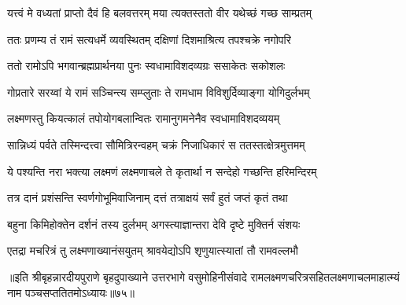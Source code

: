 \twolineshloka
{यत्त्वं मे वध्यतां प्राप्तो दैवं हि बलवत्तरम्}
{मया त्यक्तस्ततो वीर यथेच्छं गच्छ साम्प्रतम्}%

\twolineshloka
{ततः प्रणम्य तं रामं सत्यधर्मे व्यवस्थितम्}
{दक्षिणां दिशमाश्रित्य तपश्चक्रे नगोपरि}%

\twolineshloka
{ततो रामोऽपि भगवान्ब्रह्मप्रार्थनया पुनः}
{स्वधामाविशदव्यग्रः ससाकेतः सकोशलः}%

\twolineshloka
{गोप्रतारे सरय्वां ये रामं सञ्चिन्त्य सम्प्लुताः}
{ते रामधाम विविशुर्दिव्याङ्गा योगिदुर्लभम्}%

\twolineshloka
{लक्ष्मणस्तु कियत्कालं तपोयोगबलान्वितः}
{रामानुगमनेनैव स्वधामाविशदव्ययम्}%

\twolineshloka
{सान्निध्यं पर्वते तस्मिन्दत्त्वा सौमित्रिरन्वहम्}
{चक्रं निजाधिकारं स ततस्तत्क्षेत्रमुत्तमम्}%

\twolineshloka
{ये पश्यन्ति नरा भक्त्या लक्ष्मणं लक्ष्मणाचले}
{ते कृतार्था न सन्देहो गच्छन्ति हरिमन्दिरम्}%

\twolineshloka
{तत्र दानं प्रशंसन्ति स्वर्णगोभूमिवाजिनाम्}
{दत्तं तत्राक्षयं सर्वं हुतं जप्तं कृतं तथा}%

\twolineshloka
{बहुना किमिहोक्तेन दर्शनं तस्य दुर्लभम्}
{अगस्त्याज्ञान्तरा देवि दृष्टे मुक्तिर्न संशयः}%

\twolineshloka
{एतद्रा मचरित्रं तु लक्ष्मणाख्यानंसयुतम्}
{श्रावयेद्योऽपि शृणुयात्स्यातां तौ रामवल्लभौ}%

॥इति श्रीबृहन्नारदीयपुराणे बृहदुपाख्याने उत्तरभागे वसुमोहिनीसंवादे रामलक्ष्मणचरित्रसहितलक्ष्मणाचलमाहात्म्यं नाम पञ्चसप्ततितमोऽध्यायः॥७५॥
